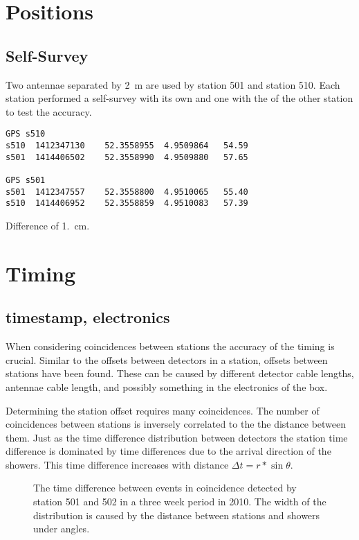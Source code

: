 \section{Positions}

\subsection{\gps Self-Survey}

Two \gps antennae separated by \SI{2}{\meter} are used by station 501
and station 510. Each station performed a self-survey with its own \gps
and one with the \gps of the other station to test the accuracy.
 
\begin{verbatim}
GPS s510
s510  1412347130	52.3558955	4.9509864	54.59
s501  1414406502	52.3558990	4.9509880	57.65

GPS s501
s501  1412347557	52.3558800	4.9510065	55.40
s510  1414406952	52.3558859	4.9510083	57.39
\end{verbatim}

Difference of \SI{1.}{\centi\meter}.


\section{Timing}

\subsection{\gps timestamp, electronics}

When considering coincidences between stations the accuracy of the
timing is crucial. Similar to the offsets between detectors in a
station, offsets between stations have been found. These can be caused
by different detector cable lengths, \gps antennae cable length, and
possibly something in the electronics of the \hisparc box.

Determining the station offset requires many coincidences. The number of
coincidences between stations is inversely correlated to the the
distance between them. Just as the time difference distribution between
detectors the station time difference is dominated by time differences
due to the arrival direction of the showers. This time difference
increases with distance $\Delta t = r * \sin{\theta}$.

\begin{figure}
    \centering
    
    \caption{ The
             time difference between events in coincidence detected by
             station 501 and 502 in a three week period in 2010. The
             width of the distribution is caused by the distance between
             stations and showers under angles.}
    \label{fig:station_offsets_501_502}
\end{figure}

